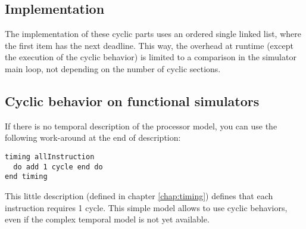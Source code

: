 \subsection{Implementation}
The implementation of these cyclic parts uses an ordered single linked list, where the first item has the next deadline. This way, the overhead at runtime (except the execution of the cyclic behavior) is limited to a comparison in the simulator main loop, not depending on the number of cyclic sections.

\subsection{Cyclic behavior on functional simulators}
If there is no temporal description of the processor model, you can use the following work-around at the end of description:
\begin{lstlisting}
timing allInstruction
  do add 1 cycle end do
end timing
\end{lstlisting}
This little description (defined in chapter \ref{chap:timing}) defines that each instruction requires 1 cycle. This simple model allows to use cyclic behaviors, even if the complex temporal model is not yet available.
